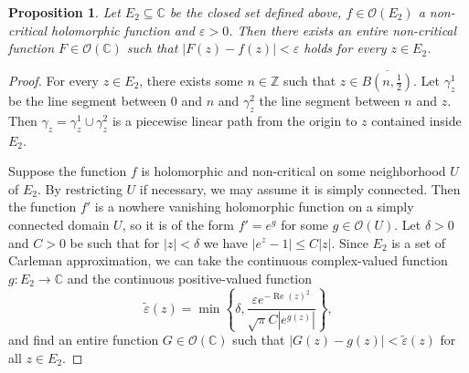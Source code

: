 \documentclass[a4paper,11pt]{amsart}
\newcommand{\Z}{\mathbb Z}
\newcommand{\C}{\mathbb C}
\newcommand{\set}[1]{\left\{#1\right\}}
\newcommand{\abs}[1]{\left|#1\right|}
\DeclareMathOperator{\re}{Re}
\newtheorem{proposition}{Proposition}
\begin{document}
\begin{proposition}
    Let $E_2 \subseteq \C$ be the closed set defined above, $f \in \mathcal{O}(E_2)$ a non-critical holomorphic function and $\varepsilon > 0$.
    Then there exists an entire non-critical function $F \in \mathcal{O}(\C)$ such that $\abs{F(z)-f(z)} < \varepsilon$ holds for every $z \in E_2$.
\end{proposition}

\begin{proof}
For every $z \in E_2$, there exists some $n \in \Z$ such that $z \in \overline{B\left(n, \frac{1}{2}\right)}$.
Let $\gamma_z^1$ be the line segment between $0$ and $n$ and $\gamma_z^2$ the line segment between $n$ and $z$.
Then $\gamma_z = \gamma_z^1 \cup \gamma_z^2$ is a piecewise linear path from the origin to $z$ contained inside $E_2$.

Suppose the function $f$ is holomorphic and non-critical on some neighborhood $U$ of $E_2$.
By restricting $U$ if necessary, we may assume it is simply connected. 
Then the function $f'$ is a nowhere vanishing holomorphic function on a simply connected domain $U$, so it is of the form $f' = e^g$ for some $g \in \mathcal{O}(U)$.
Let $\delta > 0$ and $C > 0$ be such that for $\abs{z} < \delta$ we have $\abs{e^z-1} \le C \abs{z}$. 
Since $E_2$ is a set of Carleman approximation, we can take the continuous complex-valued function $g \colon E_2 \to \C$ and the continuous positive-valued function 
\[\tilde{\varepsilon}(z) = \min\set{\delta, \frac{\varepsilon e^{-\re(z)^2}}{\sqrt{\pi}C\abs{e^{g(z)}}}},\]
and find an entire function $G \in \mathcal{O}(\C)$ such that $\abs{G(z)-g(z)} < \tilde{\varepsilon}(z)$ for all $z \in E_2$.


\end{proof}
\end{document}
